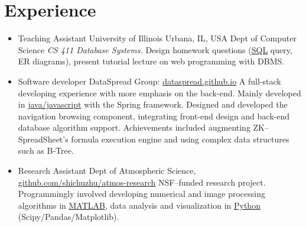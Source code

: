 \documentclass[11pt,a4paper,sans]{moderncv}        %
\begin{document}
\section{Experience}
\begin{itemize}
	
	\item{
	      {Teaching Assistant}
	      {University of Illinois}
	      {Urbana, IL, USA}
	      {Dept of Computer Science}
	      {\emph{CS 411 Database Systems.} Design homework questions (\underline{SQL} query, ER diagrams), present tutorial lecture on web programming with DBMS.}
	      }
	      
	\item{
	      {Software developer}
	      {\vspace{-10pt}}
	      {}
	      {DataSpread Group: \href{https://github.com/dataspread/dataspread-web}{\faGithub} \href{https://dataspread.github.io}{\underline{dataspread.github.io}}}
	      {
		      A full-stack developing experience with more emphasis on the back-end. Mainly developed in \underline{java/javascript} with the Spring framework. Designed and developed the navigation browsing component, integrating front-end design and back-end database algorithm support. Achievements included augmenting ZK--SpreadSheet's formula execution engine and using complex data structures such as B-Tree.}
	      }
	      
	      
	\item{
	      {Research Assistant}
	      {\vspace{-10pt}}
	      {}
	      {Dept of Atmospheric Science,
		      \href{https://github.com/shichuzhu/atmos-research}{\faGithub \underline{github.com/shichuzhu/atmos-research}}}
	      {
		      NSF--funded research project. Programmingly involved developing numerical and image processing algorithms in \underline{MATLAB}, data analysis and visualization in \underline{Python} (Scipy/Pandas/Matplotlib).}
	      }
	      

\end{itemize}
\end{document}
